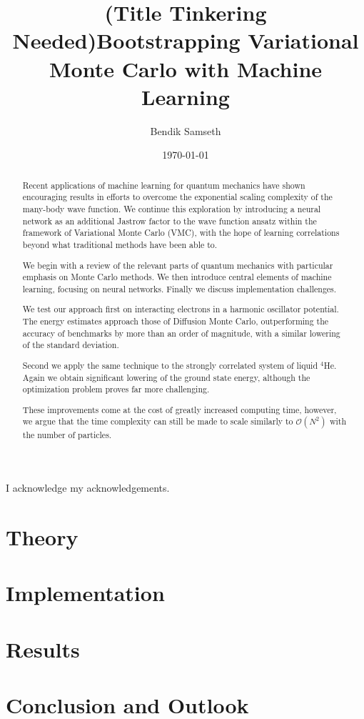 \documentclass[twoside,english]{uiofysmaster}
\author{Bendik Samseth}
\title{(Title Tinkering Needed)Bootstrapping Variational Monte Carlo with Machine Learning}
\date{\monthyeardate\today}
\begin{document}
\maketitle

\begin{abstract}
Recent applications of machine learning for quantum mechanics have shown
encouraging results in efforts to overcome the exponential scaling complexity of
the many-body wave function. We continue this exploration by introducing a
neural network as an additional Jastrow factor to the wave function ansatz
within the framework of Variational Monte Carlo (VMC), with the hope of learning
correlations beyond what traditional methods have been able to.

We begin with a review of the relevant parts of quantum mechanics with particular
emphasis on Monte Carlo methods. We then introduce central elements of machine
learning, focusing on neural networks. Finally we discuss implementation
challenges.

We test our approach first on interacting electrons in a harmonic oscillator
potential. The energy estimates approach those of Diffusion Monte Carlo,
outperforming the accuracy of benchmarks by more than an order of magnitude,
with a similar lowering of the standard deviation.

Second we apply the same technique to the strongly correlated system of liquid
$^4$He. Again we obtain significant lowering of the ground state energy,
although the optimization problem proves far more challenging.

These improvements come at the cost of greatly increased computing time,
however, we argue that the time complexity can still be made to scale similarly to
$\mathcal{O}(N^2)$ with the number of particles.
\end{abstract}

\begin{acknowledgements}
  I acknowledge my acknowledgements.
\end{acknowledgements}

\tableofcontents



\part{Theory}
\label{prt:theory}





\part{Implementation}
\label{prt:implementation}




\part{Results}
\label{prt:results}


\part{Conclusion and Outlook}
\label{prt:conclusion}


\printbibliography[heading=bibintoc, title={References}]
\end{document}
